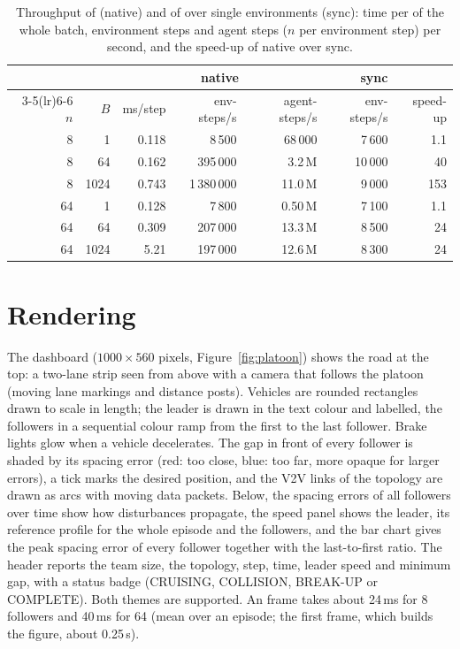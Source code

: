 \begin{table}[htbp]
  \centering\small
  \caption{Throughput of  (native) and of
     over single environments (sync): time per
     of the whole batch, environment steps and agent steps
    ($n$ per environment step) per second, and the speed-up of native over
    sync.}
  \label{tab:platoon-throughput}
  \begin{tabular}{@{}rrrrrrr@{}}
    \toprule
    & & \multicolumn{3}{c}{native} & sync & \\
    \cmidrule(lr){3-5}\cmidrule(lr){6-6}
    $n$ & $B$ & ms/step & env-steps/s & agent-steps/s & env-steps/s & speed-up \\
    \midrule
    8  & 1    & 0.118 & 8\,500      & 68\,000      & 7\,600  & 1.1 \\
    8  & 64   & 0.162 & 395\,000    & 3.2\,M       & 10\,000 & 40 \\
    8  & 1024 & 0.743 & 1\,380\,000 & 11.0\,M      & 9\,000  & 153 \\
    64 & 1    & 0.128 & 7\,800      & 0.50\,M      & 7\,100  & 1.1 \\
    64 & 64   & 0.309 & 207\,000    & 13.3\,M      & 8\,500  & 24 \\
    64 & 1024 & 5.21  & 197\,000    & 12.6\,M      & 8\,300  & 24 \\
    \bottomrule
  \end{tabular}
\end{table}

\section{Rendering}\label{sec:platoon-render}

The dashboard ($1000 \times 560$ pixels, Figure~\ref{fig:platoon}) shows the
road at the top: a two-lane strip seen from above with a camera that follows the
platoon (moving lane markings and distance posts). Vehicles are rounded
rectangles drawn to scale in length; the leader is drawn in the text colour and
labelled, the followers in a sequential colour ramp from the first to the last
follower. Brake lights glow when a vehicle decelerates. The gap in front of
every follower is shaded by its spacing error (red: too close, blue: too far,
more opaque for larger errors), a tick marks the desired position, and the V2V
links of the topology are drawn as arcs with moving data packets. Below, the
spacing errors of all followers over time show how disturbances propagate, the
speed panel shows the leader, its reference profile for the whole episode and
the followers, and the bar chart gives the peak spacing error of every follower
together with the last-to-first ratio. The header reports the team size, the
topology, step, time, leader speed and minimum gap, with a status badge
(CRUISING, COLLISION, BREAK-UP or COMPLETE). Both themes are supported. An
 frame takes about 24\,ms for 8 followers and 40\,ms for 64
(mean over an episode; the first frame, which builds the figure, about 0.25\,s).

